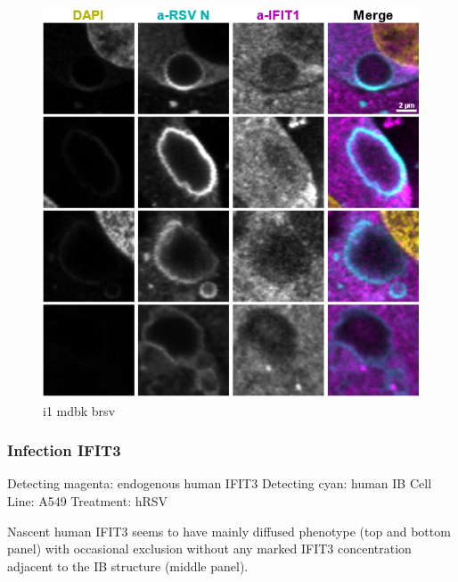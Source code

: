 \begin{figure}
    \centering
    \includegraphics[width=1\linewidth]{09. Chapter 4/Figs/02. Infection/03. mdbk i1.png}
    \caption[i1 mdbk brsv]{i1 mdbk brsv}
    \label{fig:i1 mdbk brsv}
\end{figure}

\subsubsection{Infection IFIT3}
Detecting magenta: endogenous human IFIT3 \newline
Detecting cyan: human IB \newline
Cell Line: A549 \newline
Treatment: hRSV \newline

Nascent human IFIT3 seems to have mainly diffused phenotype (top and bottom panel) with occasional exclusion without any marked IFIT3 concentration adjacent to the IB structure (middle panel).

